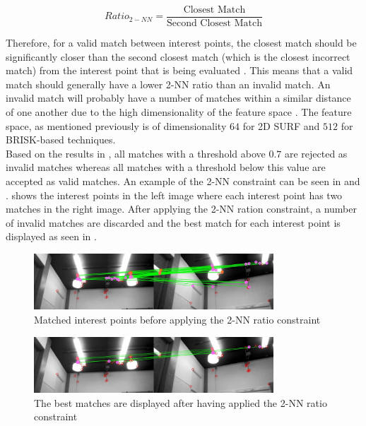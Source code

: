 \documentclass[11pt]{report}
\begin{document}
\begin{equation}
Ratio_{2-NN} = \frac{\mbox{Closest Match}}{\mbox{Second Closest Match}}
\label{eqn:2nnRatio}
\end{equation}

Therefore, for a valid match between interest points, the closest match should be significantly closer than the second closest match (which is the closest incorrect match) from the interest point that is being evaluated \cite{Lowe2004}. This means that a valid match should generally have a lower 2-NN ratio than an invalid match. An invalid match will probably have a number of matches within a similar distance of one another due to the high dimensionality of the feature space \cite{Lowe2004}. The feature space, as mentioned previously is of dimensionality $64$ for 2D SURF and $512$ for BRISK-based techniques.\\

Based on the results in , all matches with a threshold above $0.7$ are rejected as invalid matches whereas all matches with a threshold below this value are accepted as valid matches. An example of the 2-NN constraint can be seen in  and .  shows the interest points in the left image where each interest point has two matches in the right image. After applying the 2-NN ration constraint, a number of invalid matches are discarded and the best match for each interest point is displayed  as seen in .\\


\begin{figure}[h!] 
  \centering
    \includegraphics[width=0.8\textwidth]{../Drawings/Matching/feature_matching/dataset_2nn_matching_constraint_before.jpg}
    \caption{Matched interest points before applying the 2-NN ratio constraint}
    \label{fig:2nn_1}
\end{figure}

\begin{figure}[h!] 
  \centering
    \includegraphics[width=0.8\textwidth]{../Drawings/Matching/feature_matching/dataset_2nn_matching_constraint_after.jpg}
    \caption{The best matches are displayed after having applied the 2-NN ratio constraint}
    \label{fig:2nn_2}
\end{figure}
\end{document}
